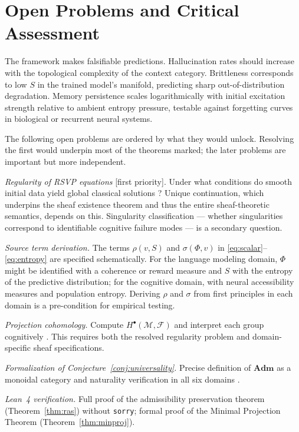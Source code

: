\documentclass[12pt, a4paper]{article}
\theoremstyle{rsvpstyle}
\theoremstyle{definition}
\newcommand{\OpMan}{\mathcal{M}}
\begin{document}
\section{Open Problems and Critical Assessment}
\label{sec:open}

The framework makes falsifiable predictions. Hallucination rates should increase
with the topological complexity of the context category. Brittleness corresponds
to low $S$ in the trained model's manifold, predicting sharp out-of-distribution
degradation. Memory persistence scales logarithmically with initial excitation
strength relative to ambient entropy pressure, testable against forgetting curves
in biological or recurrent neural systems.

The following open problems are ordered by what they would unlock. Resolving
the first would underpin most of the theorems marked; the later problems
are important but more independent.

\emph{Regularity of RSVP equations} [first priority]. Under what conditions
do smooth initial data yield global classical solutions \citep{Tao2016}?
Unique continuation, which underpins the sheaf existence theorem and thus the
entire sheaf-theoretic semantics, depends on this. Singularity classification
--- whether singularities correspond to identifiable cognitive failure modes ---
is a secondary question.

\emph{Source term derivation.} The terms $\rho(v,S)$ and $\sigma(\Phi,v)$
in \eqref{eq:scalar}--\eqref{eq:entropy} are specified schematically. For
the language modeling domain, $\Phi$ might be identified with a coherence or
reward measure and $S$ with the entropy of the predictive distribution; for
the cognitive domain, with neural accessibility measures and population entropy.
Deriving $\rho$ and $\sigma$ from first principles in each domain is a
pre-condition for empirical testing.

\emph{Projection cohomology.} Compute $H^\bullet(\OpMan, \mathcal{F})$ and
interpret each group cognitively \citep{EdelsbrunnerHarer2010}. This requires
both the resolved regularity problem and domain-specific sheaf specifications.

\emph{Formalization of Conjecture~\ref{conj:universality}.} Precise definition
of $\mathbf{Adm}$ as a monoidal category and naturality verification in all
six domains \citep{EilenbergMacLane1945}.

\emph{Lean~4 verification.} Full proof of the admissibility preservation theorem
(Theorem~\ref{thm:ras}) without \texttt{sorry}; formal proof of the Minimal
Projection Theorem (Theorem~\ref{thm:minproj}).
\end{document}

